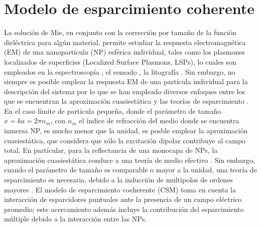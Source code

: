 \section{Modelo de esparcimiento coherente}


La solución de Mie, en conjunto con la corrección por tamaño de la función dieléctrica para algún material, permite estudiar la respuesta electromagnética (EM) de una nanopartícula (NP) esférica individual, tales como los plasmones localizados de superficies (Localized Surface Plasmons, LSPs), lo cuales son empleados en la espectroscopía \cite{novotny2006principles}, el sensado \cite{jain2008noble}, la litografía \cite{stockman2011nanoplasmonics}. Sin embargo, no siempre es posible emplear la respuesta EM de una partícula individual para la descripción del sistema por lo que se han empleado diversos enfoques entre los que se encuentran la aproximación cuasiestática y las teorías de esparcimiento \cite{pena-gomar2006coherent}. En el caso límite de partícula pequeña, donde el parámetro de tamaño $x=ka= 2\pi n_m$, con $n_m$  el índice de refracción del medio donde se encuentra inmersa NP, es mucho menor que la unidad, es posble emplear  la aproximación cuasiestática, que considera que sólo la excitación dipolar contribuye al campo total. En partícular, para la reflectancia de una monocapa de NPs, la aproximación cuasiestática conduce a una teoría de medio efectivo \cite{pena-gomar2006coherent}. Sin embargo, cuando  el parámetro de tamaño es comparable o mayor a la unidad, una teoría de esparcimiento es necesaria, debido a la inducción de multipolos de ordenes mayores \cite{pena-gomar2006coherent}. El modelo de esparcimiento coeherente (CSM) toma en cuenta la interacción de esparcidores puntuales ante la presencia de un campo eléctrico promedio; este acercamiento además incluye la contribución del esparcimiento múltiple debido a la interacción entre las NPs.
    
